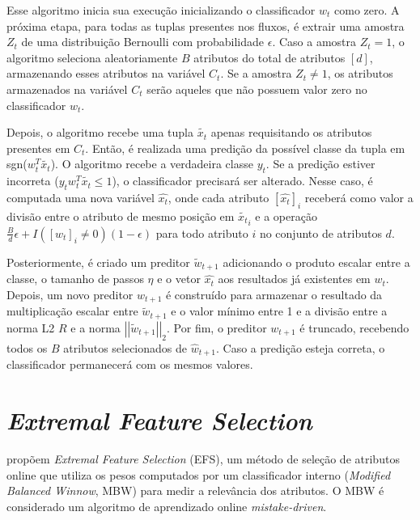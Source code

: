 
Esse algoritmo inicia sua execução inicializando o classificador $w_t$ como zero. A próxima etapa, para todas as tuplas presentes nos fluxos, é extrair uma amostra $Z_t$ de uma distribuição Bernoulli com probabilidade $\epsilon$. Caso a amostra $Z_t = 1$, o algoritmo seleciona aleatoriamente $B$ atributos do total de atributos $[d]$, armazenando esses atributos na variável $C_t$. Se a amostra $Z_t \neq 1$, os atributos armazenados na variável $C_t$ serão aqueles que não possuem valor zero no classificador $w_t$.

Depois, o algoritmo recebe uma tupla $\tilde{x_t}$ apenas requisitando os atributos presentes em $C_t$. Então, é realizada uma predição da possível classe da tupla em sgn($w_t^{T} \tilde{x_t}$). O algoritmo recebe a verdadeira classe $y_t$. Se a predição estiver incorreta ($y_tw_t^{T} \tilde{x_t} \leq 1$), o classificador precisará ser alterado.  Nesse caso, é computada uma nova variável $\hat{x_t}$, onde cada atributo $[\hat{x_t}]_i$ receberá como valor a divisão entre o atributo de mesmo posição em $\tilde{x_t}_i$ e a operação $\frac{B}{d} \epsilon + I([w_t]_i \neq 0) (1-\epsilon)$ para todo atributo $i$ no conjunto de atributos $d$. 

Posteriormente, é criado um preditor $\widetilde{w}_{t+1}$ adicionando o produto escalar entre a classe, o tamanho de passos $\eta$ e o vetor $\hat{x_t}$ aos resultados já existentes em $w_t$. Depois, um novo preditor $\hat{w}_{t+1}$ é construído para armazenar o resultado da multiplicação escalar entre  $\widetilde{w}_{t+1}$ e o valor mínimo entre 1 e a divisão entre a norma L2 $R$ e a norma $\left|\left| \widetilde{w}_{t+1} \right|\right|_2$. Por fim, o preditor ${w}_{t+1}$ é truncado, recebendo todos os $B$ atributos selecionados de $\hat{w}_{t+1}$. Caso a predição esteja correta, o classificador permanecerá com os mesmos valores. 

\section{\textit{Extremal Feature Selection}}\label{sec:efs} 

 propõem \textit{Extremal Feature Selection} (EFS),
um método de seleção de atributos online que utiliza os pesos computados por um classificador interno (\textit{Modified Balanced Winnow}, MBW) 
para medir a relevância dos atributos. O MBW é considerado um algoritmo de aprendizado online \textit{mistake-driven}. 

